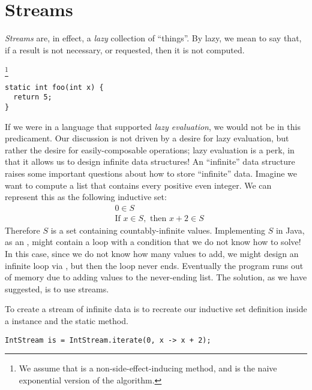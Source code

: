 \section*{Streams}
\textit{Streams} are, in effect, a \textit{lazy} collection of ``things''. By lazy, we mean to say that, if a result is not necessary, or requested, then it is not computed.

\footnote{We assume that  is a non-side-effect-inducing method, and is the naive exponential version of the algorithm.} 
\begin{verbatim}
static int foo(int x) {
  return 5;
}
\end{verbatim}
If we were in a language that supported \textit{lazy evaluation}, we would not be in this predicament. Our discussion is not driven by a desire for lazy evaluation, but rather the desire for easily-composable operations; lazy evaluation is a perk, in that it allows us to design infinite data structures! An ``infinite'' data structure raises some important questions about how to store ``infinite'' data. Imagine we want to compute a list that contains every positive even integer. We can represent this as the following inductive set:
\begin{align*}
    &0 \in S\\
    &\text{If } x \in S,\text{ then }x + 2 \in S
\end{align*}
Therefore $S$ is a set containing countably-infinite values. Implementing $S$ in Java, as an , might contain a  loop with a condition that we do not know how to solve! In this case, since we do not know how many values to add, we might design an infinite loop via , but then the loop never ends. Eventually the program runs out of memory due to adding values to the never-ending list. The solution, as we have suggested, is to use streams.

To create a stream of infinite data is to recreate our inductive set definition inside a  instance and the  static method.

\begin{verbatim}
IntStream is = IntStream.iterate(0, x -> x + 2);
\end{verbatim}


